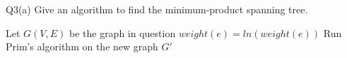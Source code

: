 \begin{problem}
  {Q3(a)}
  Give an algorithm to find the minimum-product spanning tree.
  \begin{algorithmic}[1]
    \STATE Let $G(V,E)$ be the graph in question
    \STATE $weight(e) = ln(weight(e))$
    \ENDFOR
    \STATE Run Prim's algorithm on the new graph $G'$
  \end{algorithmic}
\end{problem}
